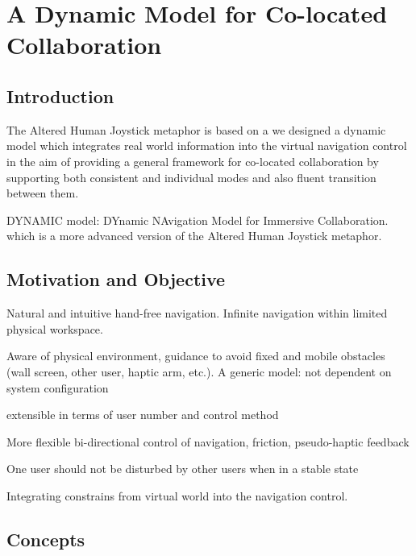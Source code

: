 \chapter{A Dynamic Model for Co-located Collaboration}
\label{chapter:dynamic_model}
\minitoc

\section{Introduction}
The Altered Human Joystick metaphor is based on a 
we designed a dynamic model which integrates real world information into the virtual navigation control in the aim of providing a general framework for co-located collaboration by supporting both consistent and individual modes and also fluent transition between them.

DYNAMIC model: DYnamic NAvigation Model for Immersive Collaboration.  which is a more advanced version of the Altered Human Joystick metaphor.



\section{Motivation and Objective}

Natural and intuitive hand-free navigation. Infinite navigation within limited physical workspace.

Aware of physical environment, guidance to avoid fixed and mobile obstacles (wall screen, other user, haptic arm, etc.). A generic model: not dependent on system configuration
 
extensible in terms of user number and control method

More flexible bi-directional control of navigation, friction, pseudo-haptic feedback

One user should not be disturbed by other users when in a stable state

Integrating constrains from virtual world into the navigation control.



\section{Concepts}

